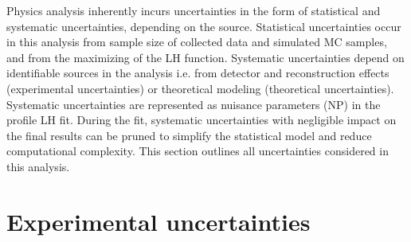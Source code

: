 \documentclass[../thesis.tex]{subfiles}
\begin{document}
\vspace{-1\baselineskip}
Physics analysis inherently incurs uncertainties in the form of statistical and systematic uncertainties, depending on the source. Statistical uncertainties occur in this analysis from sample size of collected data and simulated \acs{MC} samples, and from the maximizing of the \acs{LH} function. Systematic uncertainties depend on identifiable sources in the analysis i.e. from detector and reconstruction effects (experimental uncertainties) or theoretical modeling (theoretical uncertainties). Systematic uncertainties are represented as nuisance parameters (\acs{NP}) in the profile \acs{LH} fit. During the fit, systematic uncertainties with negligible impact on the final results can be pruned to simplify the statistical model and reduce computational complexity. This section outlines all uncertainties considered in this analysis.

\section{Experimental uncertainties}
\label{sec:sysexp}
\end{document}
